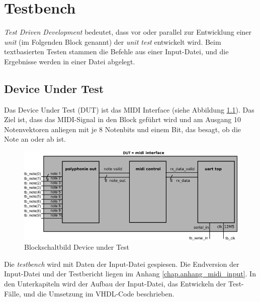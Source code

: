 
\chapter{Testbench}\label{chap.testen}
 \textit{Test Driven Development} bedeutet, dass vor oder parallel zur Entwicklung einer \textit{unit} (im Folgenden Block genannt) der \textit{unit test} entwickelt wird\cite{Testdriven}. Beim textbasierten Testen stammen die Befehle aus einer Input-Datei, und die Ergebnisse werden in einer Datei abgelegt. 

\section{Device Under Test}\label{sec.testbench_DUT}
Das Device Under Test (DUT) ist das MIDI Interface (siehe Abbildung \ref{fig.testbench}). Das Ziel ist, dass das MIDI-Signal in den Block geführt wird und am Ausgang 10 Notenvektoren anliegen mit je 8 Notenbits und einem Bit, das besagt, ob die Note an oder ab ist.

\begin{figure}[H]
	\includegraphics[width=1\textwidth]{images/midi_interface/testbench_midiinterface.png}
	\caption{Blockschaltbild Device under Test}
	\label{fig.testbench}
\end{figure} 

Die \textit{testbench} wird mit Daten der Input-Datei gespiesen. Die Endversion der Input-Datei und der Testbericht liegen im Anhang \ref{chap.anhang_midi_input}. 
In den Unterkapiteln wird der Aufbau der Input-Datei, das Entwickeln der Test-Fälle, und die Umsetzung im VHDL-Code beschrieben.



